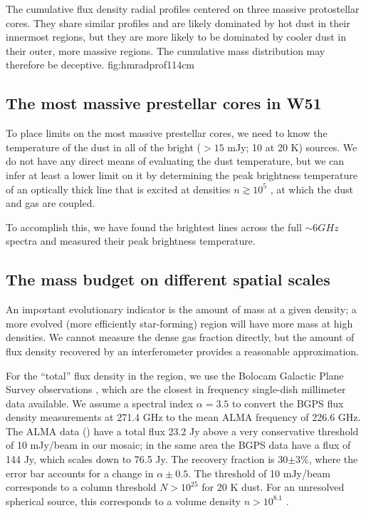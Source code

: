 \documentclass{aa}
\begin{document}
{The cumulative flux density radial profiles centered on three
massive protostellar cores.  They share similar profiles and
are likely dominated by hot dust in their innermost regions,
but they are more likely to be dominated by cooler dust in their
outer, more massive regions.  The cumulative mass distribution may
therefore be deceptive.}
{fig:hmradprof}{1}{14cm}

\subsection{The most massive prestellar cores in W51}
To place limits on the most massive prestellar cores, we need to know the
temperature of the dust in all of the bright ($>15$ mJy; 10 \msun at 20 K)
sources.  We do not have any direct means of evaluating the dust temperature,
but we can infer at
least a lower limit on it by determining the peak brightness temperature of an
optically thick line that is excited at densities $n\gtrsim10^5$ \percc, at
which the dust and gas are coupled.

To accomplish this, we have found the brightest lines across the full $\sim6
GHz$ spectra and measured their peak brightness temperature.


\subsection{The mass budget on different spatial scales}
\label{sec:massbudget}
An important evolutionary indicator is the amount of mass at a given density; a
more evolved (more efficiently star-forming) region will have more mass at high
densities.  We cannot measure the dense gas fraction directly, but the amount of
flux density recovered by an interferometer provides a reasonable approximation.

For the ``total'' flux density in the region, we use the Bolocam Galactic Plane
Survey observations \citep{Aguirre2011a,Ginsburg2013a}, which are the closest
in frequency single-dish millimeter data available.  We assume a spectral index
$\alpha=3.5$ to convert the BGPS flux density measurements at 271.4 GHz to the
mean ALMA frequency of 226.6 GHz.  The ALMA data () have a total flux 23.2 Jy above a very conservative
threshold of 10 mJy/beam in our
mosaic; in the same area the BGPS data have a flux of 144 Jy, which scales down to
76.5 Jy.  The recovery fraction is 30$\pm3$\%, where the error bar accounts
for a change in $\alpha\pm0.5$.  The threshold of 10 mJy/beam corresponds to
a column threshold $N>10^{25}$ \percc for 20 K dust.  For an unresolved spherical source,
this corresponds to a volume density $n>10^{8.1}$ \percc.
\end{document}
